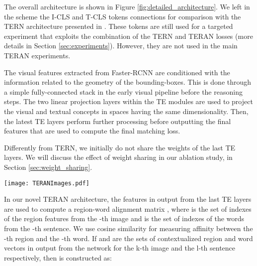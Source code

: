\documentclass[acmsmall]{acmart}
\newif\ifdraft
\newcommand{\revised}[1]{\ifdraft{\leavevmode\color{blue}{#1}}\else{#1}\fi}
\begin{document}
The overall architecture is shown in Figure \ref{fig:detailed_architecture}. \revised{We left in the scheme the I-CLS and T-CLS tokens connections for comparison with the TERN architecture presented in \cite{messina2020tern}. These tokens are still used for a targeted experiment that exploits the combination of the TERN and TERAN losses (more details in Section \ref{sec:experiments}). However, they are not used in the main TERAN experiments.}

\revised{The visual features extracted from Faster-RCNN are conditioned with the information related to the geometry of the bounding-boxes. This is done through a simple fully-connected stack in the early visual pipeline before the reasoning steps.}
The two linear projection layers within the TE modules are used to project the visual and textual concepts in spaces having the same dimensionality. Then, the latest TE layers perform further processing before outputting the final features that are used to compute the final matching loss.

Differently from TERN, we initially do not share the weights of the last TE layers. We will discuss the effect of weight sharing in our ablation study, in Section \ref{sec:weight_sharing}.

\begin{figure*}[t]
    \centering
    \texttt{[image: TERANImages.pdf]}
  \caption{The proposed TERAN architecture. \revised{TEs stands for Transformer Encoders, and it indicates a stack of TE layers whose internals are recalled in Section \ref{sec:te} and explained in detail in \cite{vaswani2017transformer}. Region and word features are extracted through a bottom-up attention model based on Faster-RCNN and BERT, respectively. The final image-text (I-T) similarity score is obtained by pooling a region-word (R-W) similarity matrix. Note that the special I-CLS and T-CLS are not used in the basic formulation of TERAN.}}
  \label{fig:detailed_architecture} 
\end{figure*}



In our novel TERAN architecture, the features in output from the last TE layers are used to compute a region-word alignment matrix , where  is the set of indexes of the region features from the -th image and  is the set of indexes of the words from the -th sentence. We use cosine similarity for measuring affinity between the -th region and the -th word. If  and  are the sets of contextualized region and word vectors in output from the network for the k-th image and the l-th sentence respectively, then  is constructed as:
\end{document}
